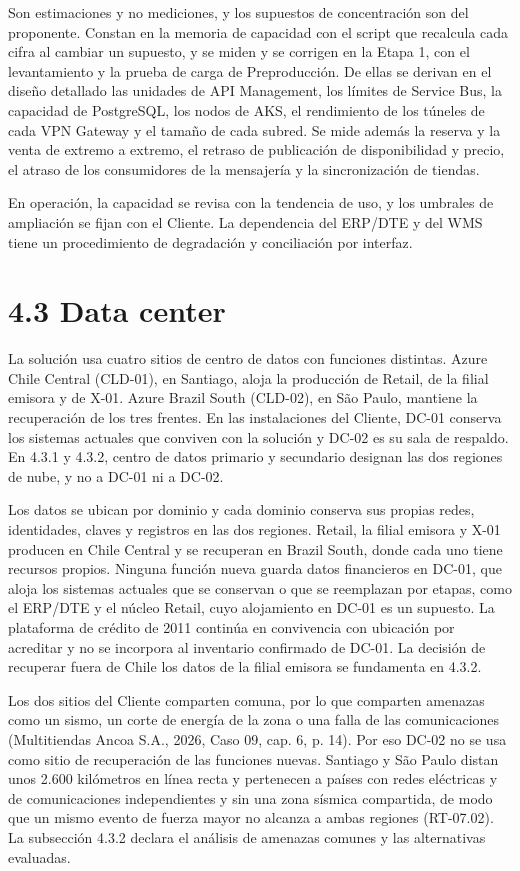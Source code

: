 \documentclass[11pt]{article}
\begin{document}
Son estimaciones y no mediciones, y los supuestos de concentración son del proponente. Constan en la memoria de capacidad con el script que recalcula cada cifra al cambiar un supuesto, y se miden y se corrigen en la Etapa 1, con el levantamiento y la prueba de carga de Preproducción. De ellas se derivan en el diseño detallado las unidades de API Management, los límites de Service Bus, la capacidad de PostgreSQL, los nodos de AKS, el rendimiento de los túneles de cada VPN Gateway y el tamaño de cada subred. Se mide además la reserva y la venta de extremo a extremo, el retraso de publicación de disponibilidad y precio, el atraso de los consumidores de la mensajería y la sincronización de tiendas.

En operación, la capacidad se revisa con la tendencia de uso, y los umbrales de ampliación se fijan con el Cliente. La dependencia del ERP/DTE y del WMS tiene un procedimiento de degradación y conciliación por interfaz.

\section{4.3 Data center}

La solución usa cuatro sitios de centro de datos con funciones distintas. Azure Chile Central (CLD-01), en Santiago, aloja la producción de Retail, de la filial emisora y de X-01. Azure Brazil South (CLD-02), en São Paulo, mantiene la recuperación de los tres frentes. En las instalaciones del Cliente, DC-01 conserva los sistemas actuales que conviven con la solución y DC-02 es su sala de respaldo. En 4.3.1 y 4.3.2, centro de datos primario y secundario designan las dos regiones de nube, y no a DC-01 ni a DC-02.

Los datos se ubican por dominio y cada dominio conserva sus propias redes, identidades, claves y registros en las dos regiones. Retail, la filial emisora y X-01 producen en Chile Central y se recuperan en Brazil South, donde cada uno tiene recursos propios. Ninguna función nueva guarda datos financieros en DC-01, que aloja los sistemas actuales que se conservan o que se reemplazan por etapas, como el ERP/DTE y el núcleo Retail, cuyo alojamiento en DC-01 es un supuesto. La plataforma de crédito de 2011 continúa en convivencia con ubicación por acreditar y no se incorpora al inventario confirmado de DC-01. La decisión de recuperar fuera de Chile los datos de la filial emisora se fundamenta en 4.3.2.

Los dos sitios del Cliente comparten comuna, por lo que comparten amenazas como un sismo, un corte de energía de la zona o una falla de las comunicaciones (Multitiendas Ancoa S.A., 2026, Caso 09, cap. 6, p. 14). Por eso DC-02 no se usa como sitio de recuperación de las funciones nuevas. Santiago y São Paulo distan unos 2.600 kilómetros en línea recta y pertenecen a países con redes eléctricas y de comunicaciones independientes y sin una zona sísmica compartida, de modo que un mismo evento de fuerza mayor no alcanza a ambas regiones (RT-07.02). La subsección 4.3.2 declara el análisis de amenazas comunes y las alternativas evaluadas.
\end{document}
